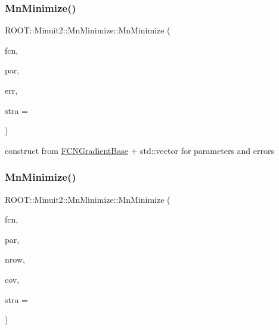 \subsubsection{\texorpdfstring{MnMinimize()}{MnMinimize()}\hspace{0.1cm}{\footnotesize\ttfamily [20/26]}}
{\footnotesize\ttfamily R\+O\+O\+T\+::\+Minuit2\+::\+Mn\+Minimize\+::\+Mn\+Minimize (\begin{DoxyParamCaption}\item[{const \mbox{\hyperlink{classROOT_1_1Minuit2_1_1FCNGradientBase}{F\+C\+N\+Gradient\+Base}} \&}]{fcn,  }\item[{const std\+::vector$<$ double $>$ \&}]{par,  }\item[{const std\+::vector$<$ double $>$ \&}]{err,  }\item[{unsigned int}]{stra = {} }\end{DoxyParamCaption})\hspace{0.3cm}{\ttfamily [inline]}}



construct from \mbox{\hyperlink{classROOT_1_1Minuit2_1_1FCNGradientBase}{F\+C\+N\+Gradient\+Base}} + std\+::vector for parameters and errors 

\mbox{\label{classROOT_1_1Minuit2_1_1MnMinimize_ad3e1fd3c735a330f90f37e8e4ac3efce}} 
\subsubsection{\texorpdfstring{MnMinimize()}{MnMinimize()}\hspace{0.1cm}{\footnotesize\ttfamily [21/26]}}
{\footnotesize\ttfamily R\+O\+O\+T\+::\+Minuit2\+::\+Mn\+Minimize\+::\+Mn\+Minimize (\begin{DoxyParamCaption}\item[{const \mbox{\hyperlink{classROOT_1_1Minuit2_1_1FCNGradientBase}{F\+C\+N\+Gradient\+Base}} \&}]{fcn,  }\item[{const std\+::vector$<$ double $>$ \&}]{par,  }\item[{unsigned int}]{nrow,  }\item[{const std\+::vector$<$ double $>$ \&}]{cov,  }\item[{unsigned int}]{stra = {} }\end{DoxyParamCaption})\hspace{0.3cm}{\ttfamily [inline]}}



